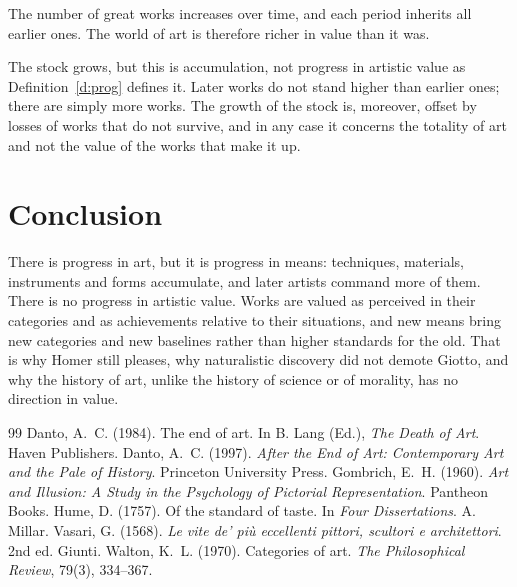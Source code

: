 \documentclass{situationist-preprint}
\begin{document}
\begin{objection}\label{o:stock}
The number of great works increases over time, and each period inherits all earlier ones. The world of art is therefore richer in value than it was.
\end{objection}

\begin{reply}
The stock grows, but this is accumulation, not progress in artistic value as Definition~\ref{d:prog} defines it. Later works do not stand higher than earlier ones; there are simply more works. The growth of the stock is, moreover, offset by losses of works that do not survive, and in any case it concerns the totality of art and not the value of the works that make it up.
\end{reply}

\section{Conclusion}

There is progress in art, but it is progress in means: techniques, materials, instruments and forms accumulate, and later artists command more of them. There is no progress in artistic value. Works are valued as perceived in their categories and as achievements relative to their situations, and new means bring new categories and new baselines rather than higher standards for the old. That is why Homer still pleases, why naturalistic discovery did not demote Giotto, and why the history of art, unlike the history of science or of morality, has no direction in value.

\begin{thebibliography}{99}\small
{} Danto, A.~C. (1984). The end of art. In B. Lang (Ed.), \emph{The Death of Art}. Haven Publishers.
 Danto, A.~C. (1997). \emph{After the End of Art: Contemporary Art and the Pale of History}. Princeton University Press.
 Gombrich, E.~H. (1960). \emph{Art and Illusion: A Study in the Psychology of Pictorial Representation}. Pantheon Books.
 Hume, D. (1757). Of the standard of taste. In \emph{Four Dissertations}. A. Millar.
 Vasari, G. (1568). \emph{Le vite de' più eccellenti pittori, scultori e architettori}. 2nd ed. Giunti.
 Walton, K.~L. (1970). Categories of art. \emph{The Philosophical Review}, 79(3), 334--367.
\end{thebibliography}
\end{document}
